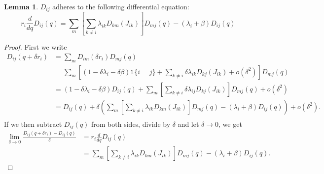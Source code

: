 \documentclass[a4paper]{thesis}
\theoremstyle{definition}
\newtheorem{lemma}{Lemma}[chapter]  %
\providecommand{\DIFaddbegin}{} %
\providecommand{\DIFaddend}{} %
\providecommand{\DIFdelbegin}{} %
\providecommand{\DIFdelend}{} %
\newcommand{\DIFscaledelfig}{0.5}
\newlength{\DIFdelgraphicswidth} %
\newlength{\DIFdelgraphicsheight} %
\newcommand{\DIFaddincludegraphics}[2][]{{\color{blue}\fbox{\DIFOincludegraphics[#1]{#2}}}} %
\newcommand{\DIFdelincludegraphics}[2][]{%
	\sbox{\DIFdelgraphicsbox}{\DIFOincludegraphics[#1]{#2}}%
	\settoboxwidth{\DIFdelgraphicswidth}{\DIFdelgraphicsbox} %
	\settoboxtotalheight{\DIFdelgraphicsheight}{\DIFdelgraphicsbox} %
	\scalebox{\DIFscaledelfig}{%
		\parbox[b]{\DIFdelgraphicswidth}{\usebox{\DIFdelgraphicsbox}\\[-\baselineskip] \rule{\DIFdelgraphicswidth}{0em}}\llap{\resizebox{\DIFdelgraphicswidth}{\DIFdelgraphicsheight}{%
				\setlength{\unitlength}{\DIFdelgraphicswidth}%
				\begin{picture}(1,1)%
				\thicklines\linethickness{2pt} %
				{\color[rgb]{1,0,0}\put(0,0){\framebox(1,1){}}}%
				{\color[rgb]{1,0,0}\put(0,0){\line( 1,1){1}}}%
				{\color[rgb]{1,0,0}\put(0,1){\line(1,-1){1}}}%
				\end{picture}%
			}\hspace*{3pt}}} %
} %
\DeclareRobustCommand{\DIFaddbegin}{\DIFOaddbegin \let\includegraphics\DIFaddincludegraphics} %
\DeclareRobustCommand{\DIFaddend}{\DIFOaddend \let\includegraphics\DIFOincludegraphics} %
\DeclareRobustCommand{\DIFdelbegin}{\DIFOdelbegin \let\includegraphics\DIFdelincludegraphics} %
\DeclareRobustCommand{\DIFdelend}{\DIFOaddend \let\includegraphics\DIFOincludegraphics} %
\begin{document}
	\begin{lemma}
		$D_{ij}$ adheres to the following differential equation:
		\begin{equation}\label{eq:MmfmDiscountDifferential}
		r_i\frac{d}{dq}D_{ij}(q)=\sum\limits_m\left[\sum\limits_{k\neq i}\lambda_{ik}D_{km}(J_{ik})\right] D_{mj}(q)-(\lambda_i+\beta)D_{ij}(q)
		\end{equation}
		\begin{proof}
			First we write
			\[
			\DIFdelbegin %
			\DIFdelend \DIFaddbegin \begin{split}
			D_{ij}(q+\delta r_i)&=\sum_mD_{im}(\delta r_i)D_{mj}(q)\\
			&=\sum\limits_m\left[(1-\delta\lambda_i-\delta\beta)\mathds{1}\{i=j\}+\sum\limits_{k\neq i}\delta\lambda_{ik}D_{kj}(J_{ik})+o(\delta^2)\right]D_{mj}(q)\\
			&=(1-\delta\lambda_i-\delta\beta)D_{ij}(q)+\sum\limits_m\left[\sum\limits_{k\neq i}\delta\lambda_{ij}D_{kj}(J_{ik})\right]D_{mj}(q)+o(\delta^2)\\
			&=D_{ij}(q)+\delta\left( \sum\limits_m\left[\sum\limits_{k\neq i}\lambda_{ik}D_{km}(J_{ik})\right] D_{mj}(q)-(\lambda_i+\beta)D_{ij}(q) \right)+o(\delta^2).\\
			\end{split}
			\DIFaddend \]
			If we then subtract $D_{ij}(q)$ from both sides, divide by $\delta$ and let $\delta\rightarrow 0$, we get
			\[
			\begin{split}
			\lim\limits_{\delta\rightarrow 0}\frac{D_{ij}(q+\delta r_i)-D_{ij}(q)}{\delta}&=r_i\frac{d}{dq}D_{ij}(q)\\
			&=\sum\limits_m\left[\sum\limits_{k\neq i}\lambda_{ik}D_{km}(J_{ik})\right] D_{mj}(q)-(\lambda_i+\beta)D_{ij}(q).
			\end{split}
			\]
		\end{proof}
	\end{lemma}
\end{document}
